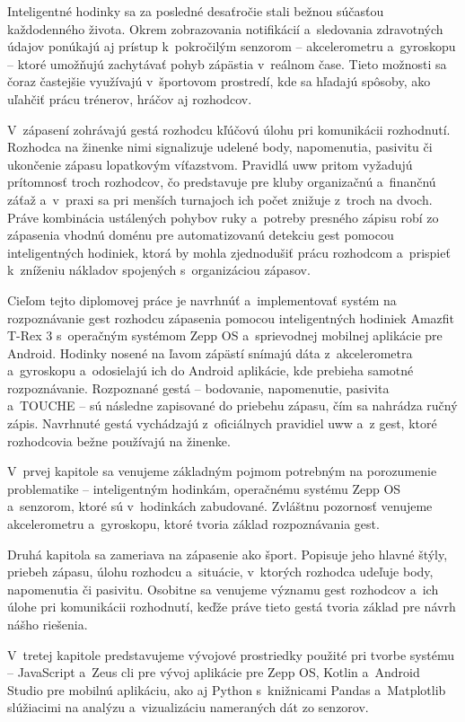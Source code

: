 Inteligentné hodinky sa za posledné desaťročie stali bežnou
súčasťou každodenného života. Okrem zobrazovania notifikácií
a~sledovania zdravotných údajov ponúkajú aj prístup
k~pokročilým senzorom -- akcelerometru a~gyroskopu -- ktoré
umožňujú zachytávať pohyb zápästia v~reálnom čase. Tieto
možnosti sa čoraz častejšie využívajú v~športovom prostredí,
kde sa hľadajú spôsoby, ako uľahčiť prácu trénerov, hráčov aj
rozhodcov.

V~zápasení zohrávajú gestá rozhodcu kľúčovú úlohu pri
komunikácii rozhodnutí. Rozhodca na žinenke nimi signalizuje
udelené body, napomenutia, pasivitu či ukončenie zápasu
lopatkovým víťazstvom. Pravidlá \Gls{uww} pritom vyžadujú
prítomnosť troch rozhodcov, čo predstavuje pre kluby
organizačnú a~finančnú záťaž a~v~praxi sa pri menších
turnajoch ich počet znižuje z~troch na dvoch. Práve
kombinácia ustálených pohybov ruky a~potreby presného zápisu
robí zo zápasenia vhodnú doménu pre automatizovanú detekciu
gest pomocou inteligentných hodiniek, ktorá by mohla
zjednodušiť prácu rozhodcom a~prispieť k~zníženiu nákladov
spojených s~organizáciou zápasov.

Cieľom tejto diplomovej práce je navrhnúť a~implementovať
systém na rozpoznávanie gest rozhodcu zápasenia pomocou
inteligentných hodiniek Amazfit T-Rex 3 s~operačným systémom
Zepp OS a~sprievodnej mobilnej aplikácie pre Android. Hodinky
nosené na ľavom zápästí snímajú dáta z~akcelerometra
a~gyroskopu a~odosielajú ich do Android aplikácie, kde
prebieha samotné rozpoznávanie. Rozpoznané gestá -- bodovanie,
napomenutie, pasivita a~TOUCHE -- sú následne zapisované do
priebehu zápasu, čím sa nahrádza ručný zápis. Navrhnuté gestá
vychádzajú z~oficiálnych pravidiel \Gls{uww} a~z gest,
ktoré rozhodcovia bežne používajú na žinenke.

V~prvej kapitole sa venujeme základným pojmom potrebným na
porozumenie problematike -- inteligentným hodinkám,
operačnému systému Zepp OS a~senzorom, ktoré sú v~hodinkách
zabudované. Zvláštnu pozornosť venujeme akcelerometru
a~gyroskopu, ktoré tvoria základ rozpoznávania gest.

Druhá kapitola sa zameriava na zápasenie ako šport. Popisuje
jeho hlavné štýly, priebeh zápasu, úlohu rozhodcu a~situácie,
v~ktorých rozhodca udeľuje body, napomenutia či pasivitu.
Osobitne sa venujeme významu gest rozhodcov a~ich úlohe pri
komunikácii rozhodnutí, keďže práve tieto gestá tvoria základ
pre návrh nášho riešenia.

V~tretej kapitole predstavujeme vývojové prostriedky použité
pri tvorbe systému -- JavaScript a~Zeus \Gls{cli} pre vývoj
aplikácie pre Zepp OS, Kotlin a~Android Studio pre mobilnú
aplikáciu, ako aj Python s~knižnicami Pandas a~Matplotlib
slúžiacimi na analýzu a~vizualizáciu nameraných dát zo
senzorov.

